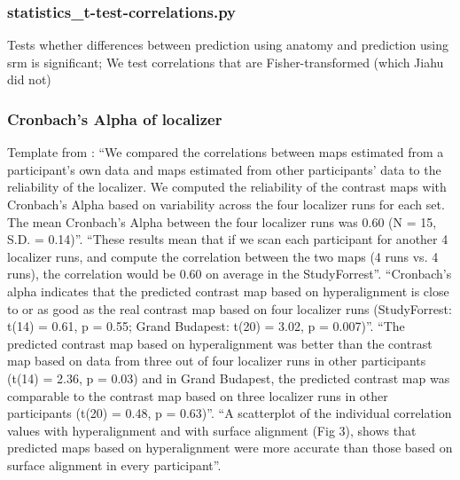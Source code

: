 


\subsubsection{statistics\_t-test-correlations.py}

Tests whether differences between prediction using anatomy and prediction using
\ac{srm} is significant;
%
We test correlations that are Fisher-transformed (which Jiahu did not)


\subsubsection{Cronbach's Alpha of localizer}



Template from \citet{jiahui2020predicting}: ``We compared the correlations
between maps estimated from a participant's own data and maps estimated from
other participants' data to the reliability of the localizer. We computed the
reliability of the contrast maps with Cronbach's Alpha based on variability
across the four localizer runs for each set. The mean Cronbach's Alpha between
the four localizer runs was 0.60 (N = 15, S.D. = 0.14)''.
%
``These results mean that if we scan each participant for another 4 localizer
runs, and compute the correlation between the two maps (4 runs vs. 4 runs), the
correlation would be 0.60 on average in the StudyForrest''.
%
``Cronbach's alpha indicates that the predicted contrast map based on
hyperalignment is close to or as good as the real contrast map based on four
localizer runs (StudyForrest: t(14) = 0.61, p = 0.55; Grand Budapest: t(20) =
3.02, p = 0.007)''.
%
``The predicted contrast map based on hyperalignment was better than the
contrast map based on data from three out of four localizer runs in other
participants (t(14) = 2.36, p = 0.03) and in Grand Budapest, the predicted
contrast map was comparable to the contrast map based on three localizer runs in
other participants (t(20) = 0.48, p = 0.63)''.
%
``A scatterplot of the individual correlation values with hyperalignment and
with surface alignment (Fig 3), shows that predicted maps based on
hyperalignment were more accurate than those based on surface alignment in every
participant''.


